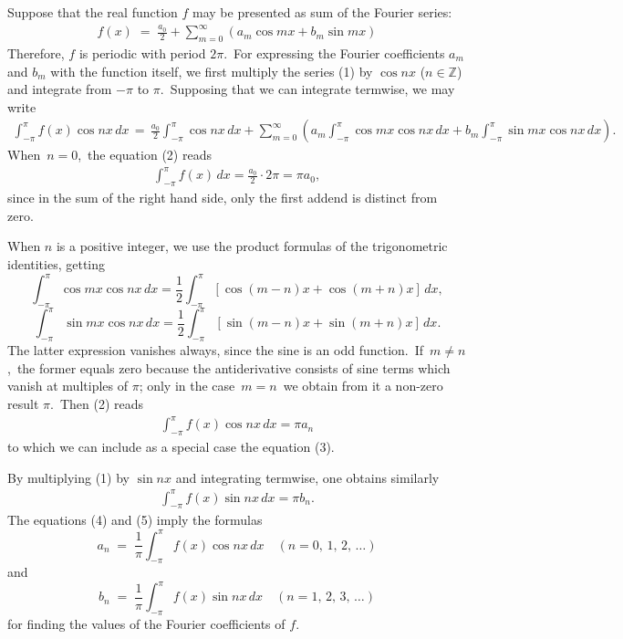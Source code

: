 \documentclass[12pt]{article}
\theoremstyle{definition}
\begin{document}
Suppose that the real function $f$ may be presented as sum of the Fourier series:
\begin{align}
f(x) \;=\; \frac{a_0}{2}+\sum_{m=0}^\infty(a_m\cos{mx}+b_m\sin{mx})
\end{align}
Therefore, $f$ is periodic with period $2\pi$.\, For expressing the Fourier coefficients $a_m$ and $b_m$
with the function itself, we first multiply the series (1) by $\cos{nx}$ ($n \in \mathbb{Z}$) and integrate from $-\pi$ to $\pi$.\, Supposing that we can integrate termwise, we may write
\begin{align}
\int_{-\pi}^\pi\!f(x)\cos{nx}\,dx \,=\, \frac{a_0}{2}\!\int_{-\pi}^\pi\!\cos{nx}\,dx
+\!\sum_{m=0}^\infty\!\left(a_m\!\int_{-\pi}^\pi\!\cos{mx}\cos{nx}\,dx+b_m\!\int_{-\pi}^\pi\!\sin{mx}\cos{nx}\,dx\right)\!.
\end{align}
When\, $n = 0$,\, the equation (2) reads
\begin{align}
\int_{-\pi}^\pi f(x)\,dx = \frac{a_0}{2}\cdot2\pi = \pi a_0,
\end{align}
since in the sum of the right hand side, only the first addend is distinct from zero. 

When $n$ is a positive integer, we use the product formulas of the trigonometric identities, getting
$$\int_{-\pi}^\pi\cos{mx}\cos{nx}\,dx 
= \frac{1}{2}\int_{-\pi}^\pi[\cos(m-n)x+\cos(m+n)x]\,dx,$$
$$\int_{-\pi}^\pi\sin{mx}\cos{nx}\,dx 
= \frac{1}{2}\int_{-\pi}^\pi[\sin(m-n)x+\sin(m+n)x]\,dx.$$
The latter expression vanishes always, since the sine is an odd function.\, If\, $m \neq n$,\, the former equals zero because the antiderivative consists of sine terms which vanish at multiples of $\pi$; only in the case\, $m = n$\, we obtain from it a non-zero result $\pi$.\, Then (2) reads
\begin{align}
\int_{-\pi}^\pi f(x)\cos{nx}\,dx = \pi a_n
\end{align}
to which we can include as a special case the equation (3).

By multiplying (1) by $\sin{nx}$ and integrating termwise, one obtains similarly
\begin{align}
\int_{-\pi}^\pi f(x)\sin{nx}\,dx = \pi b_n.
\end{align}
The equations (4) and (5) imply the formulas
$$a_n \;=\; \frac{1}{\pi}\int_{-\pi}^\pi f(x)\cos{nx}\,dx \quad (n = 0,\,1,\,2,\,\ldots)$$
and
$$b_n \;=\; \frac{1}{\pi}\int_{-\pi}^\pi f(x)\sin{nx}\,dx \quad (n = 1,\,2,\,3,\,\ldots)$$
for finding the values of the Fourier coefficients of $f$.



\end{document}
